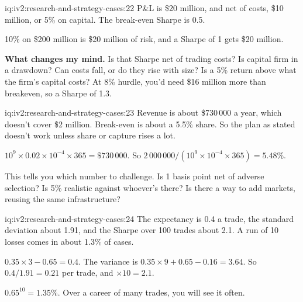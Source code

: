 \begin{solution}{iq:iv2:research-and-strategy-cases:22}
P\&L is \$20 million, and net of costs, \$10 million, or 5\% on capital. The break-even Sharpe is 0.5.

10\% on \$200 million is \$20 million of risk, and a Sharpe of 1 gets \$20 million.

\textbf{What changes my mind.} Is that Sharpe net of trading costs? Is capital firm in a drawdown? Can costs fall, or do they rise with size? Is a 5\% return above what the firm's capital costs? At 8\% hurdle, you'd need \$16 million more than breakeven, so a Sharpe of 1.3.

\end{solution}

\begin{solution}{iq:iv2:research-and-strategy-cases:23}
Revenue is about \$730\,000 a year, which doesn't cover \$2 million. Break-even is about a 5.5\% share. So the plan as stated doesn't work unless share or capture rises a lot.

$10^9 \times 0.02 \times 10^{-4} \times 365 = \$730\,000$. So $2\,000\,000/(10^9 \times 10^{-4} \times 365) = 5.48\%$.

This tells you which number to challenge. Is 1 basis point net of adverse selection? Is 5\% realistic against whoever's there? Is there a way to add markets, reusing the same infrastructure?

\end{solution}

\begin{solution}{iq:iv2:research-and-strategy-cases:24}
The expectancy is 0.4 a trade, the standard deviation about 1.91, and the Sharpe over 100 trades about 2.1. A run of 10 losses comes in about 1.3\% of cases.

$0.35 \times 3 - 0.65 = 0.4$. The variance is $0.35 \times 9 + 0.65 - 0.16 = 3.64$. So $0.4/1.91 = 0.21$ per trade, and $\times 10 = 2.1$.

$0.65^{10} = 1.35\%$. Over a career of many trades, you will see it often.

\end{solution}

